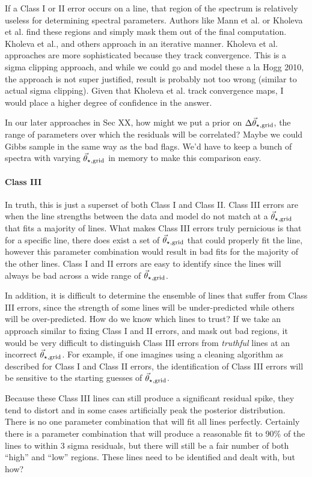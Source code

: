 \documentclass[preprint]{aastex} %
\newcommand{\vt}{\vec{\theta}}
\newcommand{\vg}{\vt_{\star, {\rm grid}}}
\begin{document}
If a Class I or II error occurs on a line, that region of the spectrum is relatively useless for determining spectral parameters. Authors like Mann et al. or Kholeva et al. find these regions and simply mask them out of the final computation. Kholeva et al., and others approach in an iterative manner. Kholeva et al. approaches are more sophisticated because they track convergence. This is a sigma clipping approach, and while we could go and model these a la Hogg 2010, the approach is not super justified, result is probably not too wrong (similar to actual sigma clipping). Given that Kholeva et al. track convergence maps, I would place a higher degree of confidence in the answer.

In our later approaches in Sec XX, how might we put a prior on $\Delta \vg$, the range of parameters over which the residuals will be correlated? Maybe we could Gibbs sample in the same way as the bad flags. We'd have to keep a bunch of spectra with varying $\vg$ in memory to make this comparison easy.

\paragraph{Class III} In truth, this is just a superset of both Class I and Class II. Class III errors are when the line strengths between the data and model do not match at a $\vg$ that fits a majority of lines. What makes Class III errors truly pernicious is that for a specific line, there does exist a set of $\vg$ that could properly fit the line, however this parameter combination would result in bad fits for the majority of the other lines. Class I and II errors are easy to identify since the lines will always be bad across a wide range of $\vg$. 

In addition, it is difficult to determine the ensemble of lines that suffer from Class III errors, since the strength of some lines will be under-predicted while others will be over-predicted. How do we know which lines to trust? If we take an approach similar to fixing Class I and II errors, and mask out bad regions, it would be very difficult to distinguish Class III errors from \emph{truthful} lines at an incorrect $\vg$. For example, if one imagines using a cleaning algorithm as described for Class I and Class II errors, the identification of Class III errors will be sensitive to the starting guesses of $\vg$.

Because these Class III lines can still produce a significant residual spike, they tend to distort and in some cases artificially peak the posterior distribution. There is no one parameter combination that will fit all lines perfectly. Certainly there is a parameter combination that will produce a reasonable fit to 90\% of the lines to within 3 sigma residuals, but there will still be a fair number of both ``high'' and ``low'' regions. These lines need to be identified and dealt with, but how?
\end{document}
